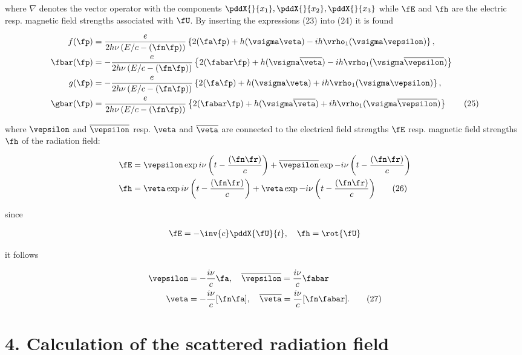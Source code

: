 \documentclass{article}
\newcommand{\nequ}[2]{
\begin{align*}
#1
\tag{#2}
\end{align*}
}
\newcommand{\uequ}[1]{
\begin{align*}
#1
\end{align*}
}
\begin{document}
where $\nabla$ denotes the vector operator with the components $\pddX{}{x_1}, \pddX{}{x_2}, \pddX{}{x_3}$ while $\fE$ and $\fh$ are the electric resp. magnetic field strengths associated with $\fU$. By inserting the expressions (23) into (24) it is found
\nequ{
f(\fp) &= \frac{e}{2h\nu\left(E/c - (\fn\fp)\right)}\left\{
2(\fa\fp) + h(\vsigma \veta) - ih\vrho_1(\vsigma \vepsilon)\right\},\\
\fbar(\fp) &= -\frac{e}{2h\nu\left(E/c - (\fn\fp)\right)}\left\{
2(\fabar\fp) + h(\vsigma \overline{\veta}) - ih\vrho_1(\vsigma \overline{\vepsilon})\right\}\\
g(\fp) &= -\frac{e}{2h\nu\left(E/c - (\fn\fp)\right)}\left\{
2(\fa\fp) + h(\vsigma \veta) + ih\vrho_1(\vsigma \vepsilon)\right\},\\
\gbar(\fp) &= \frac{e}{2h\nu\left(E/c - (\fn\fp)\right)}\left\{
2(\fabar\fp) + h(\vsigma \overline{\veta}) + ih\vrho_1(\vsigma \overline{\vepsilon})\right\}
}{25}
where $\vepsilon$ and $\overline{\vepsilon}$ resp. $\veta$ and $\overline{\veta}$ are connected to the electrical field strengths $\fE$ resp. magnetic field strengths $\fh$ of the radiation field:
\nequ{
\fE &=       \vepsilon  \exp{i\nu\left(t - \frac{(\fn\fr)}{c}\right)}
 + \overline{\vepsilon}\exp{-i\nu\left(t - \frac{(\fn\fr)}{c}\right)}\\
\fh &=       \veta\exp{i\nu\left(t - \frac{(\fn\fr)}{c}\right)}
 +           \veta\exp{-i\nu\left(t - \frac{(\fn\fr)}{c}\right)}
}{26}
since
\uequ{
\fE = -\inv{c}\pddX{\fU}{t},\quad \fh = \rot{\fU}
}
it follows
\nequ{
\vepsilon &= -\frac{i\nu}{c}\fa,\quad \overline{\vepsilon} = \frac{i\nu}{c}\fabar\\
\veta &= -\frac{i\nu}{c}[\fn\fa],\quad \overline{\veta} = \frac{i\nu}{c}[\fn\fabar].
}{27}

\section*{4. Calculation of the scattered radiation field}

\MV{\vPhi}{\Phi}
\MV{\vPsi}{\Psi}

\end{document}
